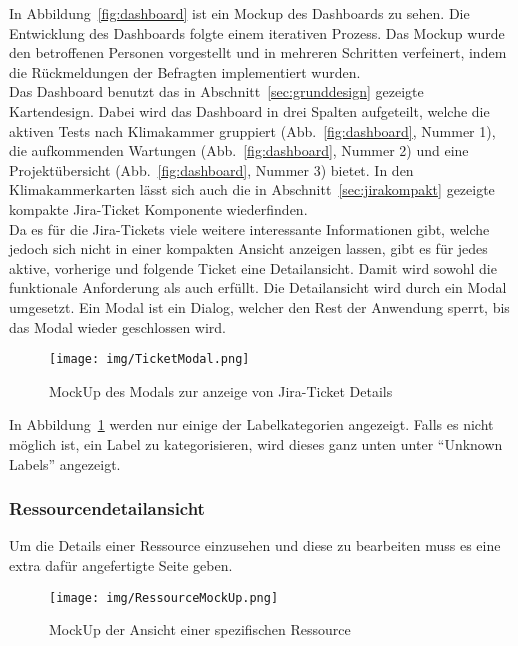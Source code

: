 In Abbildung~\ref{fig:dashboard} ist ein Mockup des Dashboards zu sehen. 
Die Entwicklung des Dashboards folgte einem iterativen Prozess. Das Mockup wurde
den betroffenen Personen vorgestellt und in mehreren Schritten verfeinert, indem die 
Rückmeldungen der Befragten implementiert wurden.\\

Das Dashboard benutzt das in Abschnitt~\ref{sec:grunddesign} gezeigte Kartendesign.
Dabei wird das Dashboard in drei Spalten aufgeteilt, welche die aktiven Tests nach
Klimakammer gruppiert (Abb.~\ref{fig:dashboard}, Nummer 1), 
die aufkommenden Wartungen (Abb.~\ref{fig:dashboard}, Nummer 2) und eine 
Projektübersicht (Abb.~\ref{fig:dashboard}, Nummer 3) bietet. In den Klimakammerkarten
lässt sich auch die in Abschnitt~\ref{sec:jirakompakt} gezeigte kompakte Jira-Ticket 
Komponente wiederfinden. \\

Da es für die Jira-Tickets viele weitere interessante Informationen gibt, welche
jedoch sich nicht in einer kompakten Ansicht anzeigen lassen, gibt es für jedes
aktive, vorherige und folgende Ticket eine Detailansicht. Damit wird sowohl die
funktionale Anforderung  als auch  erfüllt.
Die Detailansicht wird durch ein Modal umgesetzt. Ein Modal ist ein Dialog, welcher den Rest der Anwendung sperrt,
bis das Modal wieder geschlossen wird.

\begin{figure}[H]
    \texttt{[image: img/TicketModal.png]}
    \caption{MockUp des Modals zur anzeige von Jira-Ticket Details}\label{fig:modal}
\end{figure}

In Abbildung~\ref{fig:modal} werden nur einige der Labelkategorien angezeigt.
Falls es nicht möglich ist, ein Label zu kategorisieren, wird dieses ganz unten 
unter ``Unknown Labels'' angezeigt. 

\subsubsection{Ressourcendetailansicht}
Um die Details einer Ressource einzusehen und diese zu bearbeiten muss es eine 
extra dafür angefertigte Seite geben. 

\begin{figure}[H]
    \texttt{[image: img/RessourceMockUp.png]}
    \caption{MockUp der Ansicht einer spezifischen Ressource}\label{fig:ressource}
\end{figure}

